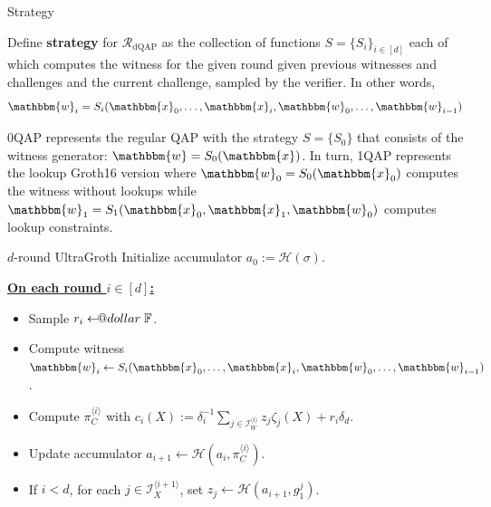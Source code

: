 \documentclass{zkdl-presentation-template}
\makeatletter
\newcommand\leftarrowS{\leftarrow\joinrel\smalldollar}
\newcommand{\smalldollar}{\mathrel{\mathpalette\small@dollar\relax}}
\newcommand{\small@dollar}[2]{%
  \vcenter{\hbox{%
    $#1\textnormal{\fontsize{0.7\dimexpr\f@size pt}{0}\selectfont\$}$%
  }}%
}
\makeatother
\begin{document}
    \begin{frame}{Strategy}
        \begin{definition}[Strategy]
            Define \textbf{strategy} for $\mathcal{R}_{\text{dQAP}}$ as the
            collection of functions $S=\{S_i\}_{i \in [d]}$ each of which
            computes the witness for the given round given previous witnesses
            and challenges and the current challenge, sampled by the verifier.
            In other words,
            \begin{equation*}
                \mathbbm{w}_i = S_i(\mathbbm{x}_0,\dots,\mathbbm{x}_i,\mathbbm{w}_0,\dots,\mathbbm{w}_{i-1})
            \end{equation*}
        \end{definition}

        \begin{example}
            0QAP represents the regular QAP with the strategy $S = \{S_0\}$ that
            consists of the witness generator: $\mathbbm{w} = S_0(\mathbbm{x})$.
            In turn, 1QAP represents the lookup Groth16 version where
            $\mathbbm{w}_0=S_0(\mathbbm{x}_0)$ computes the witness without
            lookups while
            $\mathbbm{w}_1=S_1(\mathbbm{x}_0,\mathbbm{x}_1,\mathbbm{w}_0)$
            computes lookup constraints.
        \end{example}
    \end{frame}

    \begin{frame}{$d$-round UltraGroth}
        Initialize accumulator $a_0 := \mathcal{H}(\sigma)$.

        \underline{\textbf{On each round $i \in [d]$:}}
        \begin{itemize}
            \item Sample $r_i \leftarrowS \mathbb{F}$.
            \item Compute witness $\mathbbm{w}_i \gets S_i(\mathbbm{x}_0,\dots,\mathbbm{x}_i,\mathbbm{w}_0,\dots,\mathbbm{w}_{i-1})$.
            \item Compute $\pi_C^{\langle i \rangle}$ with $c_i(X) :=
            \delta_i^{-1}\sum_{j \in \mathcal{I}_W^{\langle i \rangle}}
            z_j\zeta_j(X) + r_i\delta_d$.
            \item Update accumulator $a_{i+1} \gets \mathcal{H}(a_i, \pi_C^{\langle i \rangle})$.
            \item If $i<d$, for each $j \in \mathcal{I}_X^{\langle i+1 \rangle}$,
            set $z_j \gets \mathcal{H}(a_{i+1},g_1^j)$.
        \end{itemize}
    \end{frame}
\end{document}
